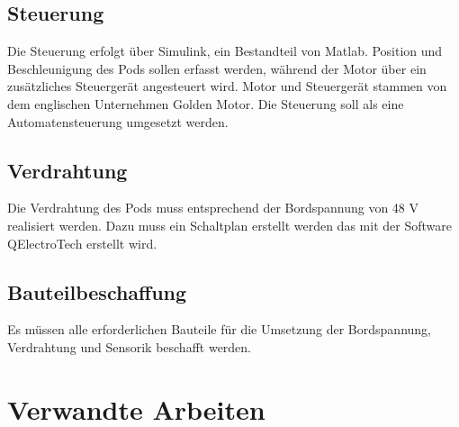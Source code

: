 \subsection{Steuerung}
Die Steuerung erfolgt über Simulink, ein Bestandteil von Matlab. Position und Beschleunigung des Pods sollen erfasst werden, während der Motor über ein zusätzliches Steuergerät angesteuert wird. Motor und Steuergerät stammen von dem englischen Unternehmen Golden Motor. Die Steuerung soll als eine Automatensteuerung umgesetzt werden.

\subsection{Verdrahtung}
Die Verdrahtung des Pods muss entsprechend der Bordspannung von 48 V realisiert werden. Dazu muss ein Schaltplan erstellt werden das mit der Software QElectroTech erstellt wird.

\subsection{Bauteilbeschaffung}
Es müssen alle erforderlichen Bauteile für die Umsetzung der Bordspannung, Verdrahtung und Sensorik beschafft werden.

\section{Verwandte Arbeiten}

\pagebreak

